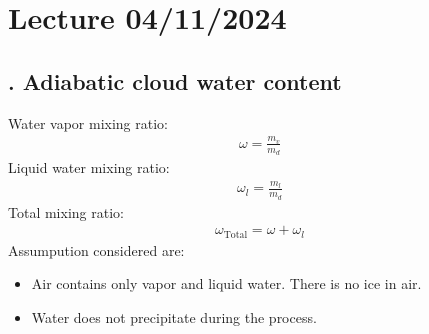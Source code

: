 \documentclass[fleqn,10pt]{SelfArx} %
\begin{document}
\clearpage

\section{Lecture 04/11/2024}

\subsection{. Adiabatic cloud water content}

Water vapor mixing ratio:
\begin{align}
    \omega = \frac{m_v}{m_d}
\end{align}
Liquid water mixing ratio:
\begin{align}
    \omega_l = \frac{m_l}{m_d}
\end{align}
Total mixing ratio:
\begin{align}
    \omega_{\text{Total}} = \omega + \omega_l
\end{align}
Assumpution considered are:
\begin{itemize}[noitemsep]
    \item Air contains only vapor and liquid water. There is no ice in air.
    \item Water does not precipitate during the process.
\end{itemize}
\end{document}
